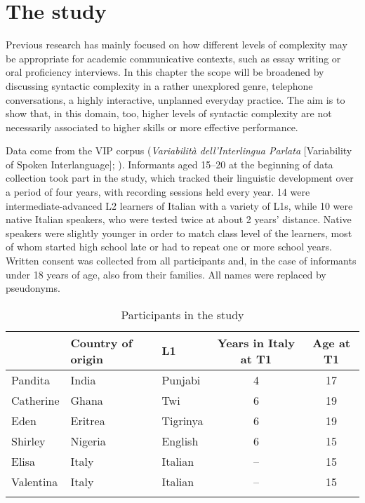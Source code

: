 \documentclass[output=paper]{langscibook}
\begin{document}
\section{The study}\label{sec:pallotti:3}

Previous research has mainly focused on how different levels of complexity may be appropriate for academic communicative contexts, such as essay writing or oral proficiency interviews. In this chapter the scope will be broadened by discussing syntactic complexity in a rather unexplored genre, telephone conversations, a highly interactive, unplanned everyday practice. The aim is to show that, in this domain, too, higher levels of syntactic complexity are not necessarily associated to higher skills or more effective performance.

Data come from the VIP corpus (\textit{Variabilità dell’Interlingua Parlata} [Variability of Spoken Interlanguage]; \citealt{PallottiEtAl2011}). Informants aged 15--20 at the beginning of data collection took part in the study, which tracked their linguistic development over a period of four years, with recording sessions held every year. 14 were intermediate-advanced L2 learners of Italian with a variety of L1s, while 10 were native Italian speakers, who were tested twice at about 2 years’ distance. Native speakers were slightly younger in order to match class level of the learners, most of whom started high school late or had to repeat one or more school years. Written consent was collected from all participants and, in the case of informants under 18 years of age, also from their families. All names were replaced by pseudonyms.

\begin{table}
\begin{tabular}{lllcc} 
\lsptoprule
& {Country of origin} & {L1} & {Years in Italy at T1} & {Age at T1}\\\midrule
Pandita & India & Punjabi & 4 & 17\\
Catherine & Ghana & Twi & 6 & 19\\
Eden & Eritrea & Tigrinya & 6 & 19\\
Shirley & Nigeria & English & 6 & 15\\
Elisa & Italy & Italian & -- & 15\\
Valentina & Italy & Italian & -- & 15\\
\lspbottomrule
\end{tabular}
\caption{Participants in the study}
\label{tab:pallotti:1}
\end{table}
\end{document}

